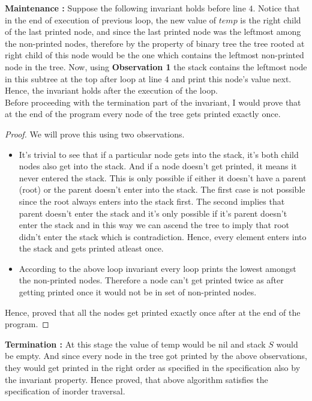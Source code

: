 \documentclass{article}
\begin{document}
{{        \noindent \textbf{Maintenance :} Suppose the following invariant holds before line $4$. Notice that in the end of execution of previous loop, the new value of $temp$ is the right child of the last printed node, and since the last printed node was the leftmost among the non-printed nodes, therefore by the property of binary tree the tree rooted at right child of this node would be the one which contains the leftmost non-printed node in the tree. Now, using \textbf{Observation 1} the stack contains the leftmost node in this subtree at the top after loop at line $4$ and print this node's value next. Hence, the invariant holds after the execution of the loop. \newline \\
        Before proceeding with the termination part of the invariant, I would prove that at the end of the program every node of the tree gets printed exactly once. 
        \begin{proof}
        We will prove this using two observations.
        \begin{itemize}
            \item It's trivial to see that if a particular node gets into the stack, it's both child nodes also get into the stack. And if a node doesn't get printed, it means it never entered the stack. This is only possible if either it doesn't have a parent (root) or the parent doesn't enter into the stack. The first case is not possible since the root always enters into the stack first. The second implies that parent doesn't enter the stack and it's only possible if it's parent doesn't enter the stack and in this way we can ascend the tree to imply that root didn't enter the stack which is contradiction. Hence, every element enters into the stack and gets printed atleast once.
            \item According to the above loop invariant every loop prints the lowest amongst the non-printed nodes. Therefore a node can't get printed twice as after getting printed once it would not be in set of non-printed nodes.
        \end{itemize}
        Hence, proved that all the nodes get printed exactly once after at the end of the program.
        \end {proof}
        \noindent \textbf {Termination :} At this stage the value of temp would be nil and stack $S$ would be empty. And since every node in the tree got printed by the above observations, they would get printed in the right order as specified in the specification also by the invariant property. Hence proved, that above algorithm satisfies the specification of inorder traversal. 
    }
}
\newpage
\end{document}
